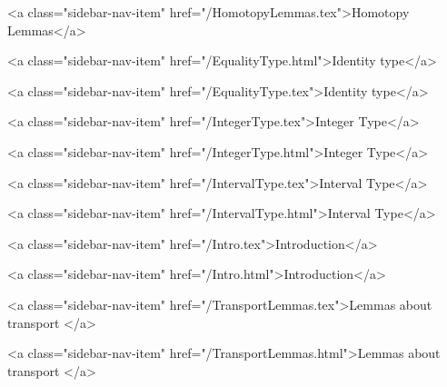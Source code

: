       
        
          <a class="sidebar-nav-item" href="/HomotopyLemmas.tex">Homotopy Lemmas</a>
        
      
    
      
        
          <a class="sidebar-nav-item" href="/EqualityType.html">Identity type</a>
        
      
    
      
        
          <a class="sidebar-nav-item" href="/EqualityType.tex">Identity type</a>
        
      
    
      
        
          <a class="sidebar-nav-item" href="/IntegerType.tex">Integer Type</a>
        
      
    
      
        
          <a class="sidebar-nav-item" href="/IntegerType.html">Integer Type</a>
        
      
    
      
        
          <a class="sidebar-nav-item" href="/IntervalType.tex">Interval Type</a>
        
      
    
      
        
          <a class="sidebar-nav-item" href="/IntervalType.html">Interval Type</a>
        
      
    
      
        
          <a class="sidebar-nav-item" href="/Intro.tex">Introduction</a>
        
      
    
      
        
          <a class="sidebar-nav-item" href="/Intro.html">Introduction</a>
        
      
    
      
        
          <a class="sidebar-nav-item" href="/TransportLemmas.tex">Lemmas about transport </a>
        
      
    
      
        
          <a class="sidebar-nav-item" href="/TransportLemmas.html">Lemmas about transport </a>
        
      
    
